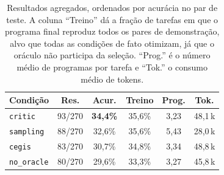 \documentclass[letterpaper]{article} %
\newcommand{\An}{270}
\newcommand{\AsampRes}{88} \newcommand{\AsampAcc}{32{,}6}
\newcommand{\AcritRes}{93} \newcommand{\AcritAcc}{34{,}4}
\newcommand{\AnoorRes}{80} \newcommand{\AnoorAcc}{29{,}6}
\newcommand{\AcegisRes}{83}\newcommand{\AcegisAcc}{30{,}7}
\newcommand{\AsampTreino}{35{,}6} \newcommand{\AcritTreino}{35{,}6}
\newcommand{\AnoorTreino}{33{,}3} \newcommand{\AcegisTreino}{34{,}8}
\newcommand{\AsampProg}{5{,}43} \newcommand{\AcritProg}{3{,}23}
\newcommand{\AnoorProg}{3{,}27} \newcommand{\AcegisProg}{3{,}34}
\newcommand{\AsampTok}{28{,}0} \newcommand{\AcritTok}{48{,}1}
\newcommand{\AnoorTok}{45{,}8} \newcommand{\AcegisTok}{48{,}8}
\begin{document}
\begin{table}[t]
\centering
\small
\setlength{\tabcolsep}{4pt}
\begin{tabular}{@{}lccccc@{}}
\toprule
Condição & Res. & Acur. & Treino & Prog. & Tok. \\
\midrule
\texttt{critic}     & \AcritRes/\An  & \textbf{\AcritAcc\%} & \AcritTreino\% & \AcritProg{} & \AcritTok\,k \\
\texttt{sampling}   & \AsampRes/\An  & \AsampAcc\%  & \AsampTreino\%  & \AsampProg{}  & \AsampTok\,k \\
\texttt{cegis}      & \AcegisRes/\An & \AcegisAcc\% & \AcegisTreino\% & \AcegisProg{} & \AcegisTok\,k \\
\texttt{no\_oracle} & \AnoorRes/\An  & \AnoorAcc\%  & \AnoorTreino\%  & \AnoorProg{}  & \AnoorTok\,k \\
\bottomrule
\end{tabular}
\caption{Resultados agregados, ordenados por acurácia no par de teste. A coluna
``Treino'' dá a fração de tarefas em que o programa final reproduz todos os pares
de demonstração, alvo que todas as condições de fato otimizam, já que o oráculo
não participa da seleção. ``Prog.'' é o número médio de programas por tarefa e
``Tok.'' o consumo médio de tokens.}
\label{tab:exp2}
\end{table}
\end{document}
